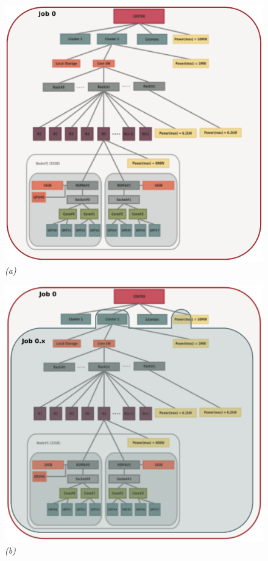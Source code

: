 \documentclass{article}
\begin{document}
\begin{figure}
\begin{minipage}{0.5\linewidth}
  \begin{center}
  \includegraphics[scale=0.45]{../fig/job-hierarchy-job0.eps}
  {\em (a)}
  \end{center}
\end{minipage}
\begin{minipage}{0.5\linewidth}
  \begin{center}
  \includegraphics[scale=0.45]{../fig/job-hierarchy-job0.x.eps}
  {\em (b)}
  \end{center}
\end{minipage}


\end{figure}
\end{document}
